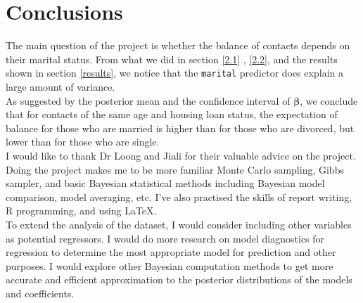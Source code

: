 \documentclass[a4page]{article}
\begin{document}
	\section{Conclusions}
	The main question of the project is whether the balance of contacts depends on their marital status. From what we did in section \ref{2.1} , \ref{2.2}, and the results shown in section \ref{results}, we notice that the \verb|marital| predictor does explain a large amount of variance.\\
    As suggested by the posterior mean and the confidence interval of $\bm{\beta}$, we conclude that for contacts of the same age and housing loan status, the expectation of balance for those who are married is higher than for those who are divorced, but lower than for those who are single.\\
    I would like to thank Dr Loong and Jiali for their valuable advice on the project. Doing the project makes me to be more familiar Monte Carlo sampling, Gibbs sampler, and basic Bayesian statistical methods including Bayesian model comparison, model averaging, etc. I've also practised the skills of report writing, R programming, and using \LaTeX.\\
    To extend the analysis of the dataset, I would consider including other variables as potential regressors. I would do more research on model diagnostics for regression to determine the most appropriate model for prediction and other purposes. I would explore other Bayesian computation methods to get more accurate and efficient approximation to the posterior distributions of the models and coefficients.
\end{document}
